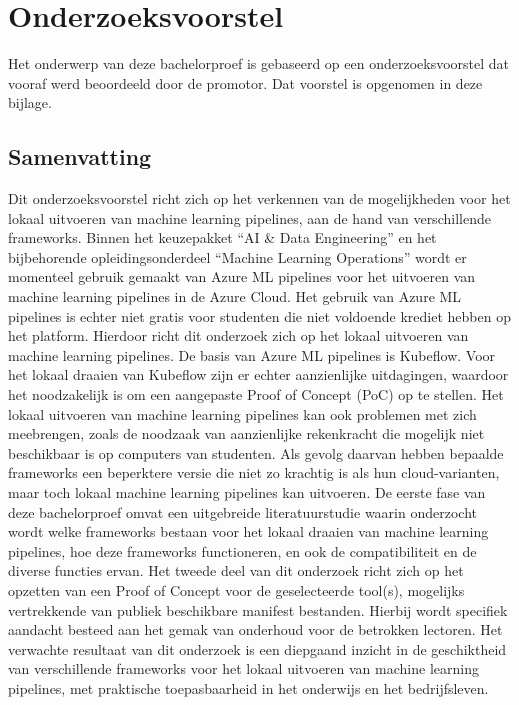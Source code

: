 \documentclass[dutch,dit,thesis]{hogentreport}
\begin{document}






%
%




\appendix

\chapter{Onderzoeksvoorstel}

Het onderwerp van deze bachelorproef is gebaseerd op een onderzoeksvoorstel dat vooraf werd beoordeeld door de promotor. Dat voorstel is opgenomen in deze bijlage.

\section*{Samenvatting}
Dit onderzoeksvoorstel richt zich op het verkennen van de mogelijkheden voor het lokaal uitvoeren van machine learning pipelines, aan de hand van verschillende frameworks.
Binnen het keuzepakket ``AI \& Data Engineering'' en het bijbehorende opleidingsonderdeel ``Machine Learning Operations'' wordt er momenteel gebruik gemaakt van Azure ML pipelines voor het uitvoeren van machine learning pipelines in de Azure Cloud.
Het gebruik van Azure ML pipelines is echter niet gratis voor studenten die niet voldoende krediet hebben op het platform. Hierdoor richt dit onderzoek zich op het lokaal uitvoeren van machine learning pipelines.
De basis van Azure ML pipelines is Kubeflow. Voor het lokaal draaien van Kubeflow zijn er echter aanzienlijke uitdagingen, waardoor het noodzakelijk is om een aangepaste Proof of Concept (PoC) op te stellen.
Het lokaal uitvoeren van machine learning pipelines kan ook problemen met zich meebrengen, zoals de noodzaak van aanzienlijke rekenkracht die mogelijk niet beschikbaar is op computers van studenten. Als gevolg daarvan hebben bepaalde frameworks een beperktere versie die niet zo krachtig is als hun cloud-varianten, maar toch lokaal machine learning pipelines kan uitvoeren.
De eerste fase van deze bachelorproef omvat een uitgebreide literatuurstudie waarin onderzocht wordt welke frameworks bestaan voor het lokaal draaien van machine learning pipelines, hoe deze frameworks functioneren, en ook de compatibiliteit en de diverse functies ervan.
Het tweede deel van dit onderzoek richt zich op het opzetten van een Proof of Concept voor de geselecteerde tool(s), mogelijks vertrekkende van publiek beschikbare manifest bestanden. Hierbij wordt specifiek aandacht besteed aan het gemak van onderhoud voor de betrokken lectoren.
Het verwachte resultaat van dit onderzoek is een diepgaand inzicht in de geschiktheid van verschillende frameworks voor het lokaal uitvoeren van machine learning pipelines, met praktische toepasbaarheid in het onderwijs en het bedrijfsleven.
\end{document}
